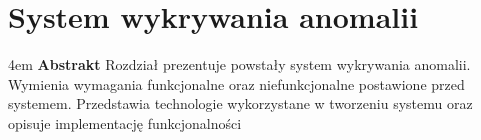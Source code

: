 \chapter{System wykrywania anomalii}

\begingroup
\leftskip4em
\rightskip\leftskip
\noindent
\textbf{Abstrakt} Rozdział prezentuje powstały system wykrywania anomalii. Wymienia wymagania funkcjonalne oraz niefunkcjonalne postawione przed systemem. Przedstawia technologie wykorzystane w tworzeniu systemu oraz opisuje implementację funkcjonalności
\par
\endgroup




